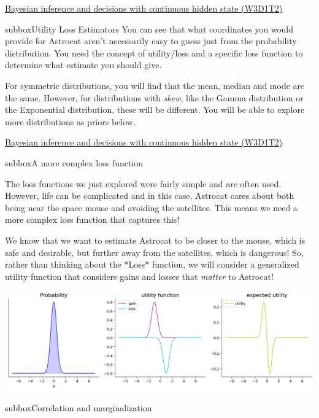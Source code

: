 \begin{textbox}{\href{https://compneuro.neuromatch.io/tutorials/W3D1_BayesianDecisions/student/W3D1_Tutorial2.html}{Bayesian inference and decisions with continuous hidden state (W3D1T2)} }
\begin{subbox}{subbox}{Utility Loss Estimators}
You can see that what coordinates you would provide for Astrocat aren't necessarily easy to guess just from the probability distribution. You need the concept of utility/loss and a specific loss function to determine what estimate you should give.

For symmetric distributions, you will find that the mean, median and mode are the same. However, for distributions with \textit{skew}, like the Gamma distribution or the Exponential distribution, these will be different. You will be able to explore more distributions as priors below.

\end{subbox}

\end{textbox}
\begin{textbox}{\href{https://compneuro.neuromatch.io/tutorials/W3D1_BayesianDecisions/student/W3D1_Tutorial2.html}{Bayesian inference and decisions with continuous hidden state (W3D1T2)} }
\begin{subbox}{subbox}{A more complex loss function}
\scriptsize



The loss functions we just explored were fairly simple and are often used. However, life can be complicated and in this case, Astrocat cares about both being near the space mouse and avoiding the satellites. This means we need a more complex loss function that captures this! 

We know that we want to estimate Astrocat to be closer to the mouse, which is safe and desirable, but further away from the satellites, which is dangerous! So, rather than thinking about the *Loss* function, we will consider a generalized utility function that considers gains and losses that \textit{matter} to Astrocat!
\begin{center}
\includegraphics[scale=0.18]{Figures/BD/BD_Figure9.png}
\end{center}


\end{subbox}
\begin{subbox}{subbox}{Correlation and marginalization}
\scriptsize


\end{subbox}
\end{textbox}
